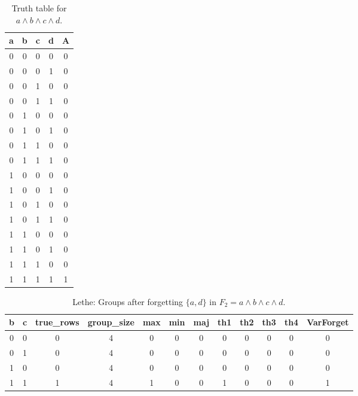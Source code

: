 \begin{table}[!tb]
    \centering
    \begin{tabular}{|c|c|c|c|c|}
        \hline
        \textbf{a} & \textbf{b} & \textbf{c} & \textbf{d} & \textbf{A} \\ \hline
        0 & 0 & 0 & 0 & 0 \\ \hline
        0 & 0 & 0 & 1 & 0 \\ \hline
        0 & 0 & 1 & 0 & 0 \\ \hline
        0 & 0 & 1 & 1 & 0 \\ \hline
        0 & 1 & 0 & 0 & 0 \\ \hline
        0 & 1 & 0 & 1 & 0 \\ \hline
        0 & 1 & 1 & 0 & 0 \\ \hline
        0 & 1 & 1 & 1 & 0 \\ \hline
        1 & 0 & 0 & 0 & 0 \\ \hline
        1 & 0 & 0 & 1 & 0 \\ \hline
        1 & 0 & 1 & 0 & 0 \\ \hline
        1 & 0 & 1 & 1 & 0 \\ \hline
        1 & 1 & 0 & 0 & 0 \\ \hline
        1 & 1 & 0 & 1 & 0 \\ \hline
        1 & 1 & 1 & 0 & 0 \\ \hline
        1 & 1 & 1 & 1 & 1 \\ \hline
    \end{tabular}
    \caption{Truth table for $a \land b \land c \land d$.}
    \label{tab:truthtab}
\end{table}

\begin{table}[!tb]
    \centering
    \begin{tabular}{|c|c|c|c|c|c|c|c|c|c|c|c|}
        \hline
        \textbf{b} & \textbf{c} & \textbf{true\_rows} & \textbf{group\_size} & \textbf{max} & \textbf{min} & \textbf{maj} & \textbf{th1} & \textbf{th2} & \textbf{th3} & \textbf{th4} & \textbf{VarForget} \\ \hline
        \rowcolor{gray!40} 0 & 0 & 0 & 4 & 0 & 0 & 0 & 0 & 0 & 0 & 0 & 0 \\ \hline
        \rowcolor{blue!40} 0 & 1 & 0 & 4 & 0 & 0 & 0 & 0 & 0 & 0 & 0 & 0 \\ \hline
        \rowcolor{red!40} 1 & 0 & 0 & 4 & 0 & 0 & 0 & 0 & 0 & 0 & 0 & 0 \\ \hline
        \rowcolor{green!40} 1 & 1 & 1 & 4 & 1 & 0 & 0 & 1 & 0 & 0 & 0 & 1 \\ \hline
    \end{tabular}
    \caption{Lethe: Groups after forgetting $\{a, d\}$ in $F_{2} = a \land b \land c \land d$.}
    \label{tab:lethe-F2-ad-groups}
\end{table}
